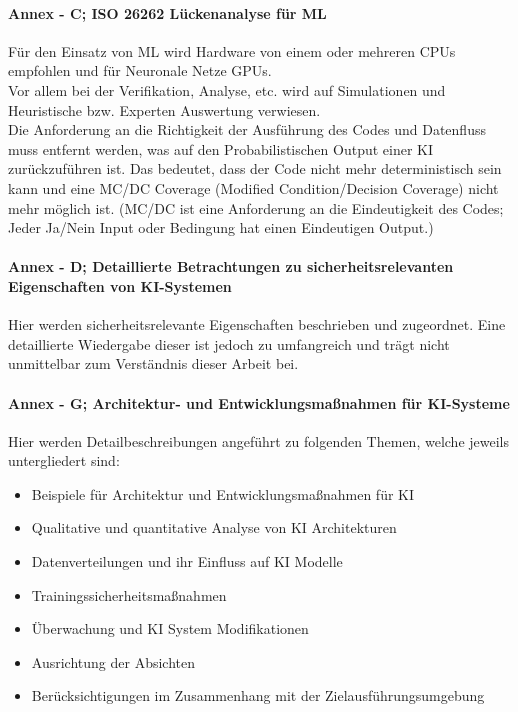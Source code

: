 \paragraph{Annex - C; ISO 26262 Lückenanalyse für ML}
Für den Einsatz von ML wird Hardware von einem oder mehreren CPUs empfohlen und 
für Neuronale Netze GPUs. \\
Vor allem bei der Verifikation, Analyse, etc. wird auf Simulationen und Heuristische 
bzw. Experten Auswertung verwiesen.\\
Die Anforderung an die Richtigkeit der Ausführung des Codes und Datenfluss muss entfernt 
werden, was auf den Probabilistischen Output einer KI zurückzuführen ist. Das bedeutet, 
dass der Code nicht mehr deterministisch sein kann und eine MC/DC Coverage (Modified Condition/Decision Coverage) 
nicht mehr möglich ist. (MC/DC ist eine Anforderung an die Eindeutigkeit des Codes; Jeder Ja/Nein Input oder 
Bedingung hat einen Eindeutigen Output.)

\paragraph{Annex - D; Detaillierte Betrachtungen zu sicherheitsrelevanten Eigenschaften von KI-Systemen}
Hier werden sicherheitsrelevante Eigenschaften beschrieben und zugeordnet. 
Eine detaillierte Wiedergabe dieser ist jedoch zu umfangreich und trägt nicht unmittelbar zum Verständnis dieser Arbeit bei.

\paragraph{Annex - G; Architektur- und Entwicklungsmaßnahmen für KI-Systeme}
Hier werden Detailbeschreibungen angeführt zu folgenden Themen, welche jeweils untergliedert sind:
\begin{itemize}
  \item Beispiele für Architektur und Entwicklungsmaßnahmen für KI
  \item Qualitative und quantitative Analyse von KI Architekturen
  \item Datenverteilungen und ihr Einfluss auf KI Modelle
  \item Trainingssicherheitsmaßnahmen
  \item Überwachung und KI System Modifikationen
  \item Ausrichtung der Absichten
  \item Berücksichtigungen im Zusammenhang mit der Zielausführungsumgebung
\end{itemize}







